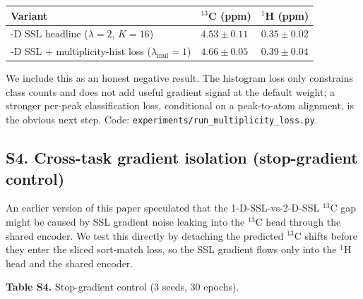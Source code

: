 \documentclass[
  11pt,
  a4paper,
]{article}
\newcounter{none} %
\begin{document}
{\def\LTcaptype{none} %
\begin{longtable}[]{@{}
  >{\raggedright\arraybackslash}p{}
  >{\raggedright\arraybackslash}p{}
  >{\raggedright\arraybackslash}p{}@{}}
\toprule\noalign{}
\begin{minipage}[b]{\linewidth}\raggedright
Variant
\end{minipage} & \begin{minipage}[b]{\linewidth}\raggedright
\(^{13}\)C (ppm)
\end{minipage} & \begin{minipage}[b]{\linewidth}\raggedright
\(^{1}\)H (ppm)
\end{minipage} \\
\midrule\noalign{}
\endhead
\bottomrule\noalign{}
\endlastfoot
2-D SSL headline (\(\lambda=2\), \(K=16\)) & \(4.53 \pm 0.11\) & \(0.35 \pm 0.02\) \\
2-D SSL + multiplicity-hist loss (\(\lambda_{\text{mul}}=1\)) & \(4.66 \pm 0.05\) & \(0.39 \pm 0.04\) \\
\end{longtable}
}

We include this as an honest negative result. The histogram loss only
constrains class counts and does not add useful gradient signal at the
default weight; a stronger per-peak classification loss, conditional on
a peak-to-atom alignment, is the obvious next step. Code:
\texttt{experiments/run\_multiplicity\_loss.py}.

\subsection*{S4. Cross-task gradient isolation (stop-gradient control)}

An earlier version of this paper speculated that the
1-D-SSL-vs-2-D-SSL \(^{13}\)C gap might be caused by SSL gradient noise
leaking into the \(^{13}\)C head through the shared encoder. We test this
directly by detaching the predicted \(^{13}\)C shifts before they enter
the sliced sort-match loss, so the SSL gradient flows only into the
\(^{1}\)H head and the shared encoder.

\textbf{Table S4.} Stop-gradient control (3 seeds, 30 epochs).
\end{document}
